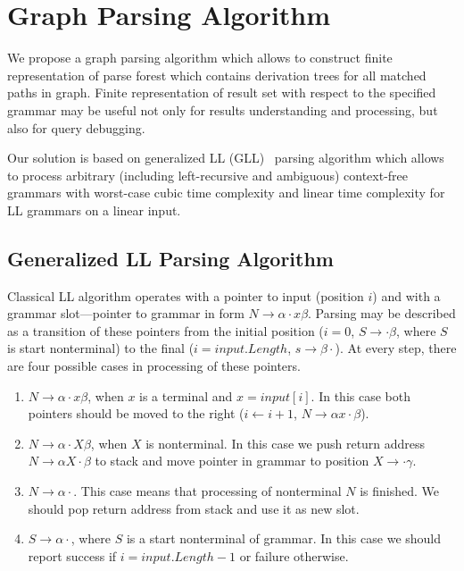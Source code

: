 \section{Graph Parsing Algorithm}

We propose a graph parsing algorithm which allows to construct finite representation of parse forest which contains derivation trees for all matched paths in graph.
Finite representation of result set with respect to the specified grammar may be useful not only for results understanding and processing, but also for query debugging. 

Our solution is based on generalized LL (GLL)~\cite{scott2010gll, FastPracticalGLL} parsing algorithm which allows to process arbitrary (including left-recursive and ambiguous) context-free grammars with worst-case cubic time complexity and linear time complexity for LL grammars on a linear input. 

\subsection{Generalized LL Parsing Algorithm}

Classical LL algorithm operates with a pointer to input (position $i$) and with a grammar slot---pointer to grammar in form $N \rightarrow \alpha \cdot x \beta $.
Parsing may be described as a transition of these pointers from the initial position ($i = 0$, $S \rightarrow \cdot \beta $, where $S$ is start nonterminal) to the final ($i = input.Length$, $s \rightarrow \beta \cdot$).
At every step, there are four possible cases in processing of these pointers. 

\begin{enumerate}
\item $N \rightarrow \alpha \cdot x \beta $, when $x$ is a terminal and $x = input[i]$. In this case both pointers should be moved to the right ($i \leftarrow i + 1$, $N \rightarrow \alpha  x \cdot \beta $).
\item $N \rightarrow \alpha \cdot X \beta $, when $X$ is nonterminal. In this case we push return address $N \rightarrow \alpha X \cdot \beta $ to stack and move pointer in grammar to position $X \rightarrow \cdot \gamma$.\label{itm:2}
\item $N \rightarrow \alpha \cdot $. This case means that processing of nonterminal $N$ is finished. We should pop return address from stack and use it as new slot.\label{itm:3}
\item $S \rightarrow \alpha \cdot $, where $S$ is a start nonterminal of grammar. In this case we should report success if $i = input.Length - 1$ or failure otherwise. 
\end{enumerate}

